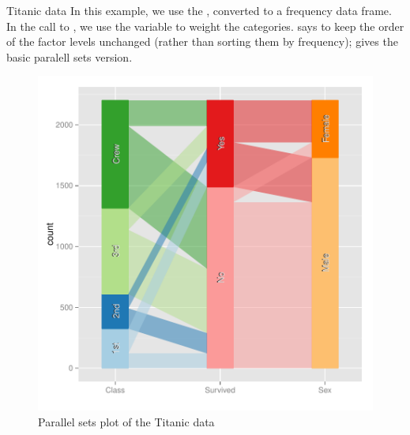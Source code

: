 \documentclass[11pt]{book}
\renewenvironment{knitrout}{\small\renewcommand{\baselinestretch}{.85}}{} %
\begin{document}
\begin{Example}{Titanic data}
In this example, we use the , converted to a frequency data frame.
In the call to , we use the  variable to weight
the categories.   says to keep the order of the factor levels 
unchanged (rather than sorting them by frequency);  gives the 
basic paralell sets version.

\begin{knitrout}
\color{fgcolor}\begin{kframe}
\begin{alltt}
 \hlkwb{<-} 
 \hlkwb{<-} \hlstd{(titanic)[}\hlstd{(}\hlstd{,} \hlstd{,} \hlstd{)]}
 \hlstd{=}\hlstd{,} \hlstd{=}\hlstd{,} \hlstd{=}\hlstd{)} \hlopt{+}
  \hlstd{(}\hlstd{=}\hlstd{,} \hlstd{=}\hlstd{)} \hlopt{+}
  \hlstd{(}\hlstd{=}\hlstd{,} \hlstd{=}\hlstd{)}
\end{alltt}
\end{kframe}\begin{figure}[!htbp]


\centerline{\includegraphics[width=.6\textwidth]{ch05/fig/titanic-par1} }

\caption[Parallel sets plot of the Titanic data]{Parallel sets plot of the Titanic data\label{fig:titanic-par1}}
\end{figure}



\end{knitrout}
\end{Example}
\end{document}
